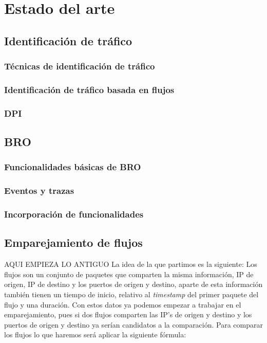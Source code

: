 \chapter{Estado del arte}

\section{Identificación de tráfico}

\subsection{Técnicas de identificación de tráfico}

\subsection{Identificación de tráfico basada en flujos}

\subsection{DPI}

\section{BRO}

\subsection{Funcionalidades básicas de BRO}

\subsection{Eventos y trazas}

\subsection{Incorporación de funcionalidades}

\section{Emparejamiento de flujos}


AQUI EMPIEZA LO ANTIGUO
\intro
La idea de la que partimos es la siguiente: 
Los flujos son un conjunto de paquetes que comparten la misma 
información, IP de origen, IP de destino y los puertos de origen 
y destino, aparte de esta información también tienen un tiempo de 
inicio, relativo al \textit{timestamp} del primer paquete del flujo y una 
duración. Con estos datos ya podemos empezar a trabajar en el 
emparejamiento, pues si dos flujos comparten las IP’s de origen y 
destino y los puertos de origen y destino ya serían candidatos a 
la comparación. 
\intro
Para comparar los flujos lo que haremos será aplicar la siguiente 
fórmula:
\intro

